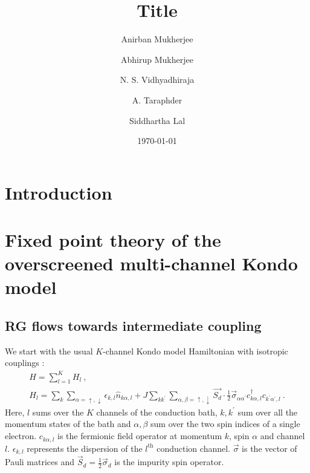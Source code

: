 \documentclass[reprint,prb,superscriptaddress]{revtex4-2}
\begin{document}
\title{Title}
\author{Anirban Mukherjee}
\author{Abhirup Mukherjee}
\author{N. S. Vidhyadhiraja}
\author{A. Taraphder}
\author{Siddhartha Lal}
\date{\today}
\begin{abstract}
	\lipsum[1-2]
\end{abstract}
\maketitle
\section{Introduction}


\section{Fixed point theory of the overscreened multi-channel Kondo model}

\subsection{RG flows towards intermediate coupling}
\label{rg_flow_section}
We start with the usual \(K\)-channel Kondo model Hamiltonian with isotropic couplings \cite{Noz_blandin_1980}:
\begin{gather}
	\label{mc_ham}
	H = \sum_{l=1}^K H_l~,\nonumber\\
	H_l = \sum_{k}\sum_{\alpha=\uparrow,\downarrow}\epsilon_{k,l} \hat n_{k\alpha,l} + J\sum_{kk^\prime} \sum_{\alpha,\beta= \uparrow,\downarrow}\vec{S_d}\cdot\frac{1}{2}\vec{\sigma}_{\alpha\alpha^\prime}c_{k\alpha,l}^\dagger c_{k^\prime\alpha^\prime, l}~.
\end{gather}
Here, \(l\) sums over the \(K\) channels of the conduction bath, \(k,k^\prime\) sum over all the momentum states of the bath and \(\alpha,\beta\) sum over the two spin indices of a single electron. \(c_{k\alpha,l}\) is the fermionic field operator at momentum \(k\), spin \(\alpha\) and channel \(l\). \(\epsilon_{k,l}\) represents the dispersion of the \(l^\text{th}\) conduction channel. \(\vec \sigma\) is the vector of Pauli matrices and \(\vec S_d = \frac{1}{2}\vec \sigma_d\) is the impurity spin operator.
\end{document}
